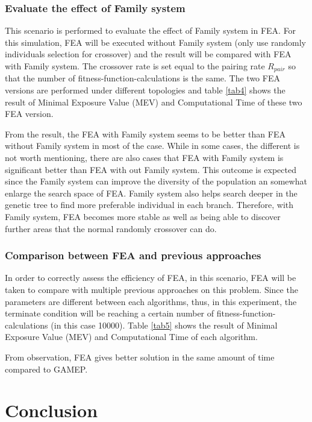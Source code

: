 \documentclass[final]{elsarticle}
\begin{document}
\subsubsection{Evaluate the effect of Family system}
This scenario is performed to evaluate the effect of Family system in FEA. For this simulation, FEA will be executed without Family system (only use randomly individuals selection for crossover) and the result will be compared with FEA with Family system. The crossover rate is set equal to the pairing rate $R_{pair}$ so that the number of fitness-function-calculations is the same. The two FEA versions are performed under different topologies and table \ref{tab4} shows the result of Minimal Exposure Value (MEV) and Computational Time of these two FEA version.

From the result, the FEA with Family system seems to be better than FEA without Family system in most of the case. While in some cases, the different is not worth mentioning, there are also cases that FEA with Family system is significant better than FEA with out Family system. This outcome is expected since the Family system can improve the diversity of the population an somewhat enlarge the search space of FEA. Family system also helps search deeper in the genetic tree to find more preferable individual in each branch. Therefore, with Family system, FEA becomes more stable as well as being able to discover further areas that the normal randomly crossover can do. 

\subsubsection{Comparison between FEA and previous approaches}
In order to correctly assess the efficiency of FEA, in this scenario, FEA will be taken to compare with multiple previous approaches on this problem. Since the parameters are different between each algorithms, thus, in this experiment, the terminate condition will be reaching a certain number of fitness-function-calculations (in this case 10000).  Table \ref{tab5} shows the result of Minimal Exposure Value (MEV) and Computational Time of each algorithm.

From observation, FEA gives better solution in the same amount of time compared to GAMEP. 

\section{Conclusion}

\begin{landscape}

\end{landscape}
\end{document}

